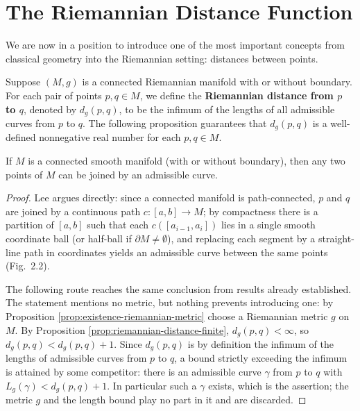 \section{The Riemannian Distance Function}

We are now in a position to introduce one of the most important concepts from classical geometry into the Riemannian setting: distances between points.

Suppose $(M, g)$ is a connected Riemannian manifold with or without boundary. For each pair of points $p, q \in M$, we define the \textbf{Riemannian distance from $p$ to $q$}, denoted by $d_g(p,q)$, to be the infimum of the lengths of all admissible curves from $p$ to $q$. The following proposition guarantees that $d_g(p,q)$ is a well-defined nonnegative real number for each $p, q \in M$.

\begin{proposition}
\label{prop:connected-manifold-admissible-curve}
\leanok
{}
If $M$ is a connected smooth manifold (with or without boundary), then any two points of $M$ can be joined by an admissible curve.
\end{proposition}

\begin{proof}
\leanok
{}
Lee argues directly: since a connected manifold is path-connected, $p$ and $q$ are joined by a continuous path $c: [a,b] \to M$; by compactness there is a partition of $[a,b]$ such that each $c([a_{i-1}, a_i])$ lies in a single smooth coordinate ball (or half-ball if $\partial M \neq \emptyset$), and replacing each segment by a straight-line path in coordinates yields an admissible curve between the same points (Fig.~2.2).

The following route reaches the same conclusion from results already established. The statement mentions no metric, but nothing prevents introducing one: by Proposition \ref{prop:existence-riemannian-metric} choose a Riemannian metric $g$ on $M$. By Proposition \ref{prop:riemannian-distance-finite}, $d_g(p,q) < \infty$, so $d_g(p,q) < d_g(p,q) + 1$. Since $d_g(p,q)$ is by definition the infimum of the lengths of admissible curves from $p$ to $q$, a bound strictly exceeding the infimum is attained by some competitor: there is an admissible curve $\gamma$ from $p$ to $q$ with $L_g(\gamma) < d_g(p,q) + 1$. In particular such a $\gamma$ exists, which is the assertion; the metric $g$ and the length bound play no part in it and are discarded.
\end{proof}


